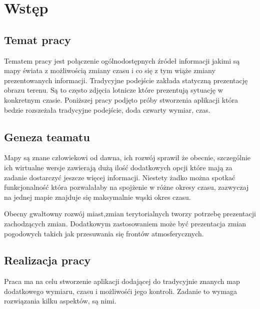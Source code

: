 \chapter{Wstęp}
\label{cha:wstep}

\nocite{gisSystems}
\nocite{webgis}
\nocite{imprxml}
\nocite{perfxml}



\section{Temat pracy}
\label{sec:tematPracy}

Tematem pracy jest połączenie ogólnodostępnych źródeł informacji jakimi są mapy świata z możliwością zmiany czasu i co się z tym wiąże zmiany prezentowanych informacji. Tradycyjne podejście zakłada statyczną prezentację obrazu terenu. Są to często zdjęcia lotnicze które prezentują sytuację w konkretnym czasie. Poniższej pracy podjęto próby stworzenia aplikacji która bedzie rozszeżała tradycyjne podejście, doda czwarty wymiar, czas.

\section{Geneza teamatu}
\label{sec:geneza}

Mapy są znane człowiekowi od dawna, ich rozwój sprawił że obecnie, szczególnie ich wirtualne wersje zawierają dużą ilość dodatkowych opcji które mają za zadanie dostarczyć jeszcze więcej informacji. Niestety żadko można spotkać funkcjonalność która pozwalałaby na spojżenie w różne okresy czasu, zazwyczaj na jednej mapie znajduje się maksymalnie wąski okres czasu.

Obecny gwałtowny rozwój miast,zmian terytorialnych tworzy potrzebę prezentacji zachodzących zmian. Dodatkowym zastosowaniem może być prezentacja zmian pogodowych takich jak przesuwania się frontów atmosferycznych.

\section{Realizacja pracy}
\label{sec:realizacja}

Praca ma na celu stworzenie aplikacji dodającej do tradycyjnie znanych map dodatkowego wymiaru, czasu i możliwośći jego kontroli. Zadanie to wymaga rozwiązania kilku aspektów, są nimi.

